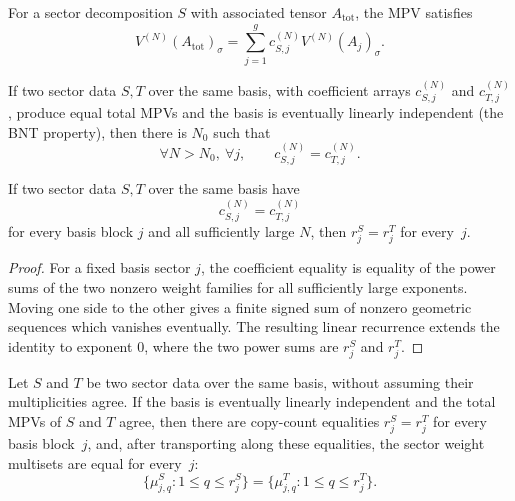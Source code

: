 \begin{lemma}%
\label{lem:paper_decomp_formula}
	\leanok
	For a sector decomposition $S$ with associated tensor $A_{\mathrm{tot}}$,
	the MPV satisfies
	\[
		V^{(N)}(A_{\mathrm{tot}})_\sigma
		= \sum_{j=1}^{g} c_{S,j}^{(N)} V^{(N)}(A_j)_\sigma.
	\]
\end{lemma}

\begin{lemma}%
\label{lem:coeff_eventually_eq}
	\leanok
	If two sector data $S, T$ over the same basis, with coefficient arrays
	$c_{S,j}^{(N)}$ and $c_{T,j}^{(N)}$, produce equal total MPVs
	and the basis is eventually linearly independent (the BNT property),
	then there is $N_0$ such that
	\[
		\forall N>N_0,\ \forall j,\qquad
		c_{S,j}^{(N)}=c_{T,j}^{(N)}.
	\]
\end{lemma}

\begin{lemma}%
\label{lem:copies_eq_of_eventually_coeff_eq}
	\leanok
	If two sector data $S,T$ over the same basis have
	\[
		c_{S,j}^{(N)}=c_{T,j}^{(N)}
	\]
	for every basis block $j$ and all sufficiently large $N$, then
	$r_j^S=r_j^T$ for every~$j$.
\end{lemma}

\begin{proof}
	\leanok
	For a fixed basis sector \(j\), the coefficient equality is equality of
	the power sums of the two nonzero weight families for all sufficiently large
	exponents.  Moving one side to the other gives a finite signed sum of
	nonzero geometric sequences which vanishes eventually.  The resulting
	linear recurrence extends the identity to exponent \(0\), where the two
	power sums are \(r_j^S\) and \(r_j^T\).
\end{proof}

\begin{lemma}%
\label{lem:route_b_equal_with_copies}
	\leanok
	Let $S$ and $T$ be two sector data over the same basis, without assuming
	their multiplicities agree. If the basis is eventually linearly
	independent and the total MPVs of $S$ and $T$ agree, then there are
	copy-count equalities $r_j^S = r_j^T$ for every basis block~$j$, and,
	after transporting along these equalities, the sector weight multisets
	are equal for every~$j$:
	\[
		\{\mu_{j,q}^{S}:1\le q\le r_j^S\}
		=
		\{\mu_{j,q}^{T}:1\le q\le r_j^T\}.
	\]
\end{lemma}

